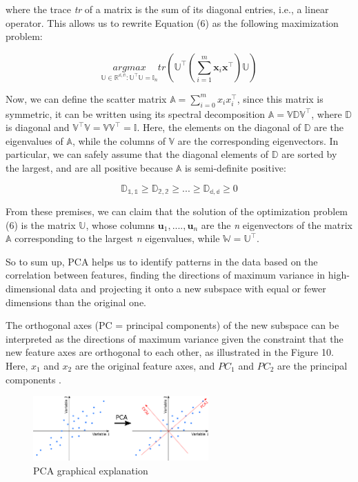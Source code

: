 \documentclass{article}
\begin{document}
where the trace \emph{tr}  of a matrix is the sum of its diagonal entries, i.e., a linear operator. This allows us to rewrite Equation (6) as the following maximization problem:

\begin{equation}
\underset{\mathbb{U}\in\mathbb{R^{d,n}}: \mathbb{U}^{\top}\mathbb{U}=\mathbb{I}_{n} } {argmax} tr(\mathbb{U}^{\top} (\sum_{i=1}^{m} \textbf{x}_{i}\textbf{x}^{\top}) \mathbb{U})
\end{equation}

Now, we can define the scatter matrix $ \mathbb{A} = \sum_{i=0}^{m} x_{i}x_{i}^{\top}$, since this matrix is symmetric, it can be written using its spectral decomposition $ \mathbb{A} =  \mathbb{VDV^{\top}} $, where  
$\mathbb{D}$ is diagonal and $ \mathbb{V^{\top}}\mathbb{V} = \mathbb{V}\mathbb{V^{\top}} = \mathbb{I}$. Here, the elements on the diagonal of  
$\mathbb{D}$ are the eigenvalues of $\mathbb{A}$, while the columns of $\mathbb{V}$ are the corresponding eigenvectors. In particular, we can safely assume that the diagonal elements of 
$\mathbb{D}$ are sorted by the largest, and are all positive because $\mathbb{A}$ is semi-definite positive:

\begin{equation}
\mathbb{D_{1,1}} \geq \mathbb{D_{2,2}} \geq ... \geq \mathbb{D_{d,d}} \geq 0
\end{equation}

From these premises, we can claim that the solution of the optimization problem (6) is the matrix $\mathbb{U}$, whose columns $\textbf{u}_{1}, ...., \textbf{u}_{n} $ are the \emph{n} eigenvectors of the matrix $\mathbb{A}$ corresponding to the largest \emph{n} eigenvalues, while $\mathbb{W} = \mathbb{U^{\top}} $.

So to sum up, PCA helps us to identify patterns in the data based on the correlation between features, finding the directions of maximum variance in high-dimensional data and projecting it onto a new subspace with equal or fewer dimensions than the original one.

The orthogonal axes (PC = principal components) of the new subspace can be interpreted as the directions of maximum variance given the constraint that the new feature axes are orthogonal to each other, as illustrated in the Figure 10. Here, $x_{1}$ and  $x_{2}$ are the original feature axes, and $PC_{1}$ and $PC_{2}$ are the principal components \cite{cinque}.

\begin{figure}[h]
\centering
\includegraphics[width=0.6\textwidth]{PCA2D.png}
\caption{PCA graphical explanation}
\end{figure}
\end{document}
